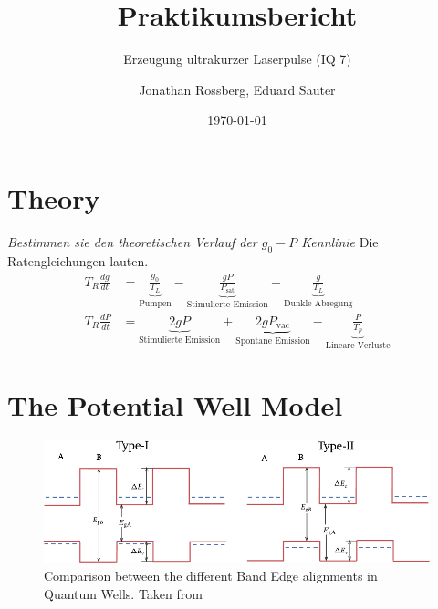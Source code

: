 \documentclass[11pt,twoside=true]{scrartcl}
\title{Praktikumsbericht}
\subtitle{Erzeugung ultrakurzer Laserpulse (IQ 7)}
\author{Jonathan Rossberg,
      Eduard Sauter}
\date{\today}
\newcommand{\dd}[2]{\frac{d{#1}}{d{#2}}}
\begin{document}
\maketitle

\section{Theory}
\textsl{Bestimmen sie den theoretischen Verlauf der $g_0-P$ Kennlinie} 
%
Die Ratengleichungen lauten.
\begin{align*}
  T_R \dd{g}{t} & 
    = \underbrace{\frac{g_0}{T_L}}_{\text{Pumpen}}   
    - \underbrace{\frac{g P}{ P_{\text{sat}}}}_{\text{Stimulierte Emission}}  
    - \underbrace{\frac{g}{T_L}}_{\text{Dunkle Abregung}} \\
  T_R \dd{P}{t} & 
    = \underbrace{2 g P}_{\text{Stimulierte Emission}}  
    + \underbrace{2 g P_\text{vac}}_{\text{Spontane Emission}}  
    - \underbrace{\frac{P}{T_p}}_{\text{Lineare Verluste}}
\end{align*}
%

\section{The Potential Well Model}
\begin{figure}[h!]
  \centering
  \includegraphics[width=1\textwidth]{./figures/quantum_well_types}
  \caption{Comparison between the different Band Edge alignments in Quantum 
  Wells. Taken from \cite{yucardona}}
  \label{fig:quantum_well_types}
\end{figure}
\end{document}
